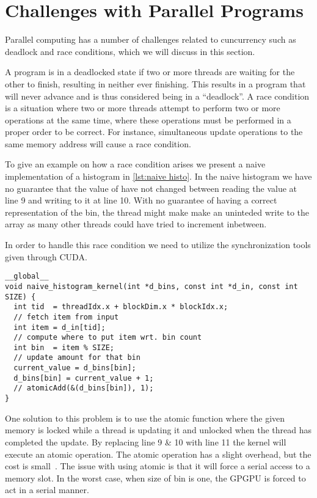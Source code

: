 \section{Challenges with Parallel Programs}
\label{sec:challenges with parallel programs}

Parallel computing has a number of challenges related to cuncurrency such as deadlock and race conditions, which we will discuss in this section.

A program is in a deadlocked state if two or more threads are waiting for the other to finish, resulting in neither ever finishing.
This results in a program that will never advance and is thus considered being in a ``deadlock''.
A race condition is a situation where two or more threads attempt to perform two or more operations at the same time, where these operations must be performed in a proper order to be correct.
For instance, simultaneous update operations to the same memory address will cause a race condition.~\cite{farber2011cuda}

To give an example on how a race condition arises we present a naive implementation of a histogram in \cref{lst:naive histo}.
In the naive histogram we have no guarantee that the value of  have not changed between reading the value at line 9 and writing to it at line 10.
With no guarantee of having a correct representation of the bin, the thread might make make an uninteded write to the array as many other threads could have tried to increment inbetween.

In order to handle this race condition we need to utilize the synchronization tools given through CUDA.

\begin{lstlisting}[caption={Naive histogram implementation with race condition}, label={lst:naive histo}]
__global__
void naive_histogram_kernel(int *d_bins, const int *d_in, const int SIZE) {
  int tid  = threadIdx.x + blockDim.x * blockIdx.x;
  // fetch item from input
  int item = d_in[tid];
  // compute where to put item wrt. bin count
  int bin  = item % SIZE;
  // update amount for that bin
  current_value = d_bins[bin];
  d_bins[bin] = current_value + 1;
  // atomicAdd(&(d_bins[bin]), 1);
}
\end{lstlisting}

One solution to this problem is to use the atomic function where the given memory is locked while a thread is updating it and unlocked when the thread has completed the update.
By replacing line 9 \& 10 with line 11 the kernel will execute an atomic operation.
The atomic operation has a slight overhead, but the cost is small~\cite{udacity}.
The issue with using atomic is that it will force a serial access to a memory slot.
In the worst case, when size of bin is one, the GPGPU is forced to act in a serial manner.
